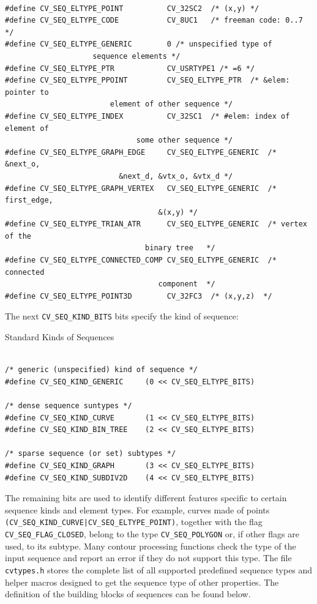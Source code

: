 \begin{lstlisting}

#define CV_SEQ_ELTYPE_POINT          CV_32SC2  /* (x,y) */
#define CV_SEQ_ELTYPE_CODE           CV_8UC1   /* freeman code: 0..7 */
#define CV_SEQ_ELTYPE_GENERIC        0 /* unspecified type of 
					sequence elements */
#define CV_SEQ_ELTYPE_PTR            CV_USRTYPE1 /* =6 */
#define CV_SEQ_ELTYPE_PPOINT         CV_SEQ_ELTYPE_PTR  /* &elem: pointer to 
						element of other sequence */
#define CV_SEQ_ELTYPE_INDEX          CV_32SC1  /* #elem: index of element of 
						      some other sequence */
#define CV_SEQ_ELTYPE_GRAPH_EDGE     CV_SEQ_ELTYPE_GENERIC  /* &next_o, 
						  &next_d, &vtx_o, &vtx_d */
#define CV_SEQ_ELTYPE_GRAPH_VERTEX   CV_SEQ_ELTYPE_GENERIC  /* first_edge, 
								   &(x,y) */
#define CV_SEQ_ELTYPE_TRIAN_ATR      CV_SEQ_ELTYPE_GENERIC  /* vertex of the 
							    binary tree   */
#define CV_SEQ_ELTYPE_CONNECTED_COMP CV_SEQ_ELTYPE_GENERIC  /* connected 
							       component  */
#define CV_SEQ_ELTYPE_POINT3D        CV_32FC3  /* (x,y,z)  */

\end{lstlisting}

The next \texttt{CV\_SEQ\_KIND\_BITS} bits specify the kind of sequence:

Standard Kinds of Sequences

\begin{lstlisting}

/* generic (unspecified) kind of sequence */
#define CV_SEQ_KIND_GENERIC     (0 << CV_SEQ_ELTYPE_BITS)

/* dense sequence suntypes */
#define CV_SEQ_KIND_CURVE       (1 << CV_SEQ_ELTYPE_BITS)
#define CV_SEQ_KIND_BIN_TREE    (2 << CV_SEQ_ELTYPE_BITS)

/* sparse sequence (or set) subtypes */
#define CV_SEQ_KIND_GRAPH       (3 << CV_SEQ_ELTYPE_BITS)
#define CV_SEQ_KIND_SUBDIV2D    (4 << CV_SEQ_ELTYPE_BITS)

\end{lstlisting}

The remaining bits are used to identify different features specific
to certain sequence kinds and element types. For example, curves
made of points \texttt{(CV\_SEQ\_KIND\_CURVE|CV\_SEQ\_ELTYPE\_POINT)},
together with the flag \texttt{CV\_SEQ\_FLAG\_CLOSED}, belong to the
type \texttt{CV\_SEQ\_POLYGON} or, if other flags are used, to its
subtype. Many contour processing functions check the type of the input
sequence and report an error if they do not support this type. The
file \texttt{cvtypes.h} stores the complete list of all supported
predefined sequence types and helper macros designed to get the sequence
type of other properties. The definition of the building
blocks of sequences can be found below.

